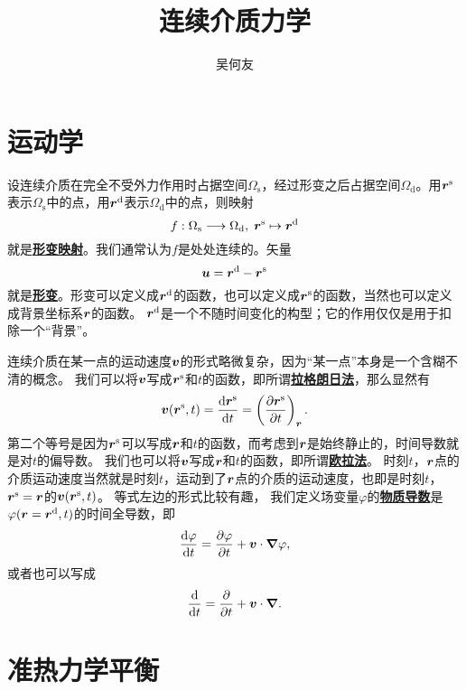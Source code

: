 \documentclass[hyperref, UTF8, a4paper]{ctexart}
\title{连续介质力学}
\author{吴何友}
\newcommand{\concept}[1]{\underline{\textbf{#1}}}
\begin{document}
\maketitle

\section{运动学}

设连续介质在完全不受外力作用时占据空间$\Omega_\text{s}$，经过形变之后占据空间$\Omega_\text{d}$。用$\vb*{r}^\text{s}$表示$\Omega_\text{s}$中的点，用$\vb*{r}^\text{d}$表示$\Omega_\text{d}$中的点，则映射
\[
    f: \Omega_\text{s} \longrightarrow \Omega_\text{d}, \; \vb*{r}^\text{s} \mapsto \vb*{r}^\text{d}
\]
就是\concept{形变映射}。我们通常认为$f$是处处连续的。矢量
\begin{equation}
    \vb*{u} = \vb*{r}^\text{d} - \vb*{r}^\text{s}
\end{equation}
就是\concept{形变}。形变可以定义成$\vb*{r}^\text{d}$的函数，也可以定义成$\vb*{r}^\text{s}$的函数，当然也可以定义成背景坐标系$\vb*{r}$的函数。
$\vb*{r}^\text{d}$是一个不随时间变化的构型；它的作用仅仅是用于扣除一个“背景”。

连续介质在某一点的运动速度$\vb*{v}$的形式略微复杂，因为“某一点”本身是一个含糊不清的概念。
我们可以将$\vb*{v}$写成$\vb*{r}^\text{s}$和$t$的函数，即所谓\concept{拉格朗日法}，那么显然有
\begin{equation}
    \vb*{v}(\vb*{r}^\text{s}, t) = \dv{\vb*{r}^\text{s}}{t} = \left( \pdv{\vb*{r}^\text{s}}{t} \right)_{\vb*{r}}.
\end{equation}
第二个等号是因为$\vb*{r}^\text{s}$可以写成$\vb*{r}$和$t$的函数，而考虑到$\vb*{r}$是始终静止的，时间导数就是对$t$的偏导数。
我们也可以将$\vb*{v}$写成$\vb*{r}$和$t$的函数，即所谓\concept{欧拉法}。
时刻$t$，$\vb*{r}$点的介质运动速度当然就是时刻$t$，运动到了$\vb*{r}$点的介质的运动速度，也即是时刻$t$，$\vb*{r}^\text{s}=\vb*{r}$的$\vb*{v}(\vb*{r}^\text{s}, t)$。
等式左边的形式比较有趣，
我们定义场变量$\varphi$的\concept{物质导数}是$\varphi(\vb*{r}=\vb*{r}^\text{d}, t)$的时间全导数，即
\begin{equation}
    \dv{\varphi}{t} = \pdv{\varphi}{t} + \vb*{v} \cdot \grad \varphi,
\end{equation}
或者也可以写成
\begin{equation}
    \dv{t} = \pdv{t} + \vb*{v} \cdot \grad.
\end{equation}

\section{准热力学平衡}
\end{document}
